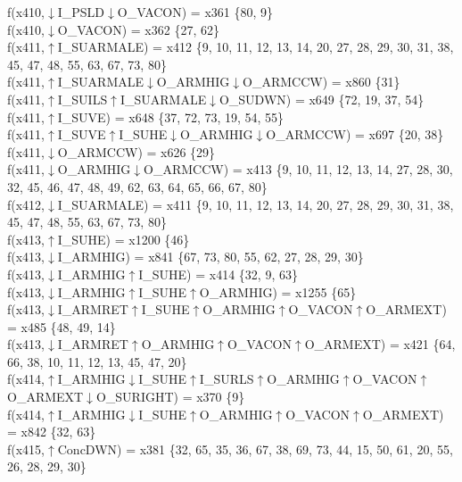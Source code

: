 f(x410,$\downarrow$I\_PSLD$\downarrow$O\_VACON) = x361 \{80, 9\} \\  
f(x410,$\downarrow$O\_VACON) = x362 \{27, 62\} \\  
f(x411,$\uparrow$I\_SUARMALE) = x412 \{9, 10, 11, 12, 13, 14, 20, 27, 28, 29, 30, 31, 38, 45, 47, 48, 55, 63, 67, 73, 80\} \\  
f(x411,$\uparrow$I\_SUARMALE$\downarrow$O\_ARMHIG$\downarrow$O\_ARMCCW) = x860 \{31\} \\  
f(x411,$\uparrow$I\_SUILS$\uparrow$I\_SUARMALE$\downarrow$O\_SUDWN) = x649 \{72, 19, 37, 54\} \\  
f(x411,$\uparrow$I\_SUVE) = x648 \{37, 72, 73, 19, 54, 55\} \\  
f(x411,$\uparrow$I\_SUVE$\uparrow$I\_SUHE$\downarrow$O\_ARMHIG$\downarrow$O\_ARMCCW) = x697 \{20, 38\} \\  
f(x411,$\downarrow$O\_ARMCCW) = x626 \{29\} \\  
f(x411,$\downarrow$O\_ARMHIG$\downarrow$O\_ARMCCW) = x413 \{9, 10, 11, 12, 13, 14, 27, 28, 30, 32, 45, 46, 47, 48, 49, 62, 63, 64, 65, 66, 67, 80\} \\  
f(x412,$\downarrow$I\_SUARMALE) = x411 \{9, 10, 11, 12, 13, 14, 20, 27, 28, 29, 30, 31, 38, 45, 47, 48, 55, 63, 67, 73, 80\} \\  
f(x413,$\uparrow$I\_SUHE) = x1200 \{46\} \\  
f(x413,$\downarrow$I\_ARMHIG) = x841 \{67, 73, 80, 55, 62, 27, 28, 29, 30\} \\  
f(x413,$\downarrow$I\_ARMHIG$\uparrow$I\_SUHE) = x414 \{32, 9, 63\} \\  
f(x413,$\downarrow$I\_ARMHIG$\uparrow$I\_SUHE$\uparrow$O\_ARMHIG) = x1255 \{65\} \\  
f(x413,$\downarrow$I\_ARMRET$\uparrow$I\_SUHE$\uparrow$O\_ARMHIG$\uparrow$O\_VACON$\uparrow$O\_ARMEXT) = x485 \{48, 49, 14\} \\  
f(x413,$\downarrow$I\_ARMRET$\uparrow$O\_ARMHIG$\uparrow$O\_VACON$\uparrow$O\_ARMEXT) = x421 \{64, 66, 38, 10, 11, 12, 13, 45, 47, 20\} \\  
f(x414,$\uparrow$I\_ARMHIG$\downarrow$I\_SUHE$\uparrow$I\_SURLS$\uparrow$O\_ARMHIG$\uparrow$O\_VACON$\uparrow$O\_ARMEXT$\downarrow$O\_SURIGHT) = x370 \{9\} \\  
f(x414,$\uparrow$I\_ARMHIG$\downarrow$I\_SUHE$\uparrow$O\_ARMHIG$\uparrow$O\_VACON$\uparrow$O\_ARMEXT) = x842 \{32, 63\} \\  
f(x415,$\uparrow$ConcDWN) = x381 \{32, 65, 35, 36, 67, 38, 69, 73, 44, 15, 50, 61, 20, 55, 26, 28, 29, 30\} \\  
